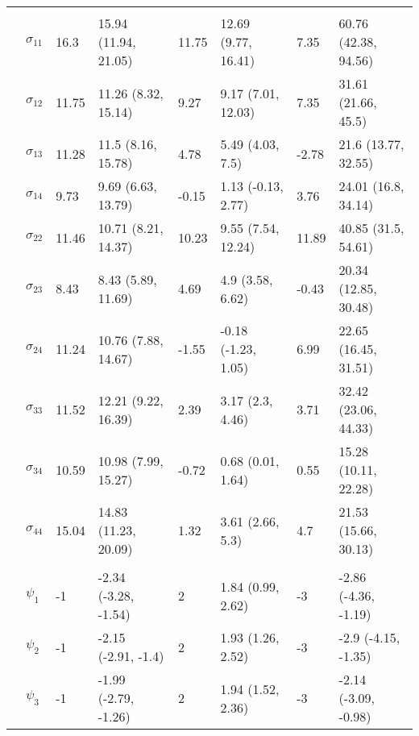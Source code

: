 \documentclass[]{article}
\begin{document}
\begin{table}[t]
\begin{tabular}{llllllll}
\addlinespace[0.3em]
\multicolumn{8}{l}{\textbf{ }}\\
\hspace{1em} & $\sigma_{11}$ & 16.3 & 15.94 (11.94, 21.05) & 11.75 & 12.69 (9.77, 16.41) & 7.35 & 60.76 (42.38, 94.56)\\
\hspace{1em} & $\sigma_{12}$ & 11.75 & 11.26 (8.32, 15.14) & 9.27 & 9.17 (7.01, 12.03) & 7.35 & 31.61 (21.66, 45.5)\\
\hspace{1em} & $\sigma_{13}$ & 11.28 & 11.5 (8.16, 15.78) & 4.78 & 5.49 (4.03, 7.5) & -2.78 & 21.6 (13.77, 32.55)\\
\hspace{1em} & $\sigma_{14}$ & 9.73 & 9.69 (6.63, 13.79) & -0.15 & 1.13 (-0.13, 2.77) & 3.76 & 24.01 (16.8, 34.14)\\
\hspace{1em} & $\sigma_{22}$ & 11.46 & 10.71 (8.21, 14.37) & 10.23 & 9.55 (7.54, 12.24) & 11.89 & 40.85 (31.5, 54.61)\\
\hspace{1em} & $\sigma_{23}$ & 8.43 & 8.43 (5.89, 11.69) & 4.69 & 4.9 (3.58, 6.62) & -0.43 & 20.34 (12.85, 30.48)\\
\hspace{1em} & $\sigma_{24}$ & 11.24 & 10.76 (7.88, 14.67) & -1.55 & -0.18 (-1.23, 1.05) & 6.99 & 22.65 (16.45, 31.51)\\
\hspace{1em} & $\sigma_{33}$ & 11.52 & 12.21 (9.22, 16.39) & 2.39 & 3.17 (2.3, 4.46) & 3.71 & 32.42 (23.06, 44.33)\\
\hspace{1em} & $\sigma_{34}$ & 10.59 & 10.98 (7.99, 15.27) & -0.72 & 0.68 (0.01, 1.64) & 0.55 & 15.28 (10.11, 22.28)\\
\hspace{1em} & $\sigma_{44}$ & 15.04 & 14.83 (11.23, 20.09) & 1.32 & 3.61 (2.66, 5.3) & 4.7 & 21.53 (15.66, 30.13)\\
\addlinespace[0.3em]
\multicolumn{8}{l}{\textbf{ }}\\
\hspace{1em} & $\psi_{1}$ & -1 & -2.34 (-3.28, -1.54) & 2 & 1.84 (0.99, 2.62) & -3 & -2.86 (-4.36, -1.19)\\
\hspace{1em} & $\psi_{2}$ & -1 & -2.15 (-2.91, -1.4) & 2 & 1.93 (1.26, 2.52) & -3 & -2.9 (-4.15, -1.35)\\
\hspace{1em} & $\psi_{3}$ & -1 & -1.99 (-2.79, -1.26) & 2 & 1.94 (1.52, 2.36) & -3 & -2.14 (-3.09, -0.98)\\

\end{tabular}
\end{table}
\end{document}
